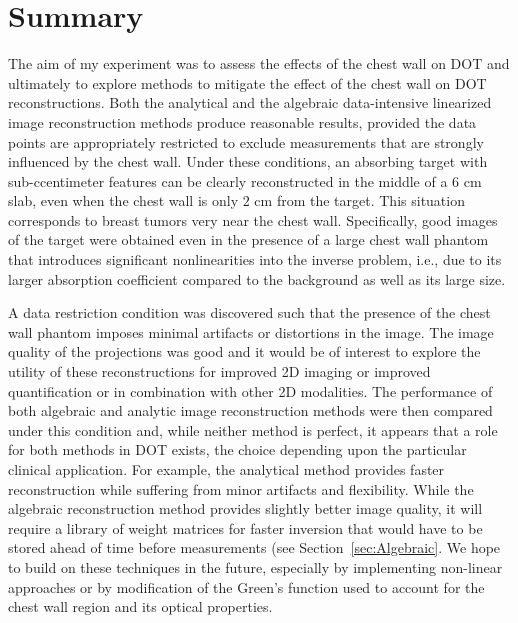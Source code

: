 \section{Summary}
\label{sec:3_summary}
The aim of my experiment was to assess the effects of the chest wall on DOT and ultimately to explore methods to mitigate the effect of the chest wall on DOT reconstructions. Both the analytical and the algebraic data-intensive linearized image reconstruction methods produce reasonable results, provided the data points are appropriately restricted to exclude measurements that are strongly influenced by the chest wall. Under these conditions, an absorbing target with sub-ccentimeter features can be clearly reconstructed in the middle of a $6$ cm slab, even when the chest wall is only $2$ cm from the target. This situation corresponds to breast tumors very near the chest wall. Specifically, good images of the target were obtained even in the presence of a large chest wall phantom that introduces significant nonlinearities into the inverse problem,  i.e., due to its larger absorption coefficient compared to the background as well as its large size. 

A data restriction condition was discovered such that the presence of the chest wall phantom imposes minimal artifacts or distortions in the image. The image quality of the projections was good and it would be of interest to explore the utility of these reconstructions for improved 2D imaging or improved quantification or in combination with other 2D modalities. The performance of both algebraic and analytic image reconstruction methods were then compared under this condition and, while neither method is perfect, it appears that a role for both methods in DOT exists, the choice depending upon the particular clinical application. For example, the analytical method provides faster reconstruction while suffering from minor artifacts and flexibility. While the algebraic reconstruction method provides slightly better image quality, it will require a library of weight matrices for faster inversion that would have to be stored ahead of time before measurements (see Section~\ref{sec:Algebraic}. We hope to build on these techniques in the future, especially by implementing non-linear approaches or by modification of the Green's function used to account for the chest wall region and its optical properties.